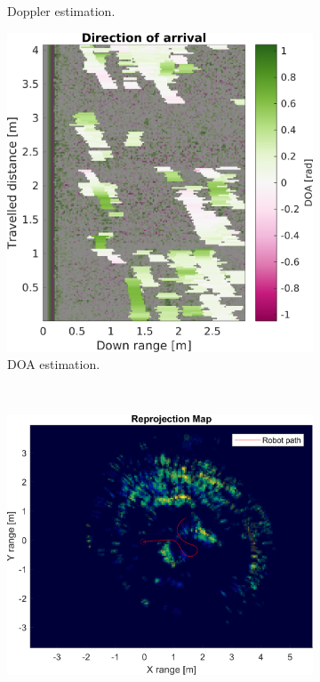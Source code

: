 \begin{figure}[htbp]
\begin{subfigure}[t]{.3\textwidth}
        \caption{Doppler estimation.}
        \label{fig:pres3-d}
    \end{subfigure}%
    \hfill%
    \begin{subfigure}[t]{.3\textwidth}
        \includegraphics[max width=\linewidth]{gfx/figures/t_doa.png}
        \caption{DOA estimation.}
        \label{fig:pres3-doa}
    \end{subfigure}\medskip\\
    \begin{subfigure}[t]{.45\textwidth}
        \includegraphics[max width=\linewidth]{gfx/results/torturechamber_reprojection.png}

\end{subfigure}
\end{figure}

